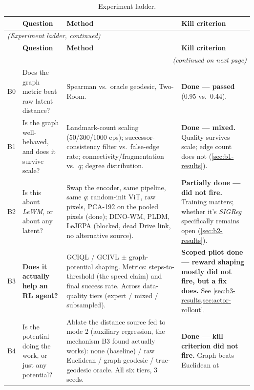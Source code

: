 \documentclass[11pt]{article}
\begin{document}
\begin{center}
\small
\begin{longtable}{@{}p{0.5cm}p{3.5cm}p{5.1cm}p{4.6cm}@{}}
\caption{Experiment ladder.} \\
\toprule
& \textbf{Question} & \textbf{Method} & \textbf{Kill criterion} \\
\midrule
\endfirsthead
\multicolumn{4}{l}{\small\itshape (Experiment ladder, continued)} \\
\toprule
& \textbf{Question} & \textbf{Method} & \textbf{Kill criterion} \\
\midrule
\endhead
\bottomrule
\multicolumn{4}{r}{\small\itshape (continued on next page)} \\
\endfoot
\bottomrule
\endlastfoot
B0 & Does the graph metric beat raw latent distance? & Spearman vs.\ oracle geodesic, Two-Room.
& \textcolor{cAmber}{\textbf{Done --- passed}} (0.95 vs.\ 0.44). \\
\addlinespace
B1 & Is the graph well-behaved, and does it survive scale? & Landmark-count scaling
(50/300/1000 eps); successor-consistency filter vs.\ false-edge rate; connectivity/fragmentation
vs.\ $q$; degree distribution. & \textcolor{cAmber}{\textbf{Done --- mixed.}} Quality survives
scale; edge count does not (\cref{sec:b1-results}). \\
\addlinespace
B2 & Is this about \emph{LeWM}, or about any latent? & Swap the encoder, same pipeline, same
$q$: random-init ViT, raw pixels, PCA-192 on the pooled pixels (done); DINO-WM, PLDM, LeJEPA
(blocked, dead Drive link, no alternative source). & \textcolor{cAmber}{\textbf{Partially done ---
did not fire.}} Training matters; whether it's \emph{SIGReg} specifically remains open
(\cref{sec:b2-results}). \\
\addlinespace
B3 & \textbf{Does it actually help an RL agent?} & GCIQL / GCIVL $\pm$ graph-potential shaping.
Metrics: steps-to-threshold (the speed claim) and final success rate. Across data-quality tiers
(expert / mixed / subsampled). & \textcolor{cAmber}{\textbf{Scoped pilot done --- reward shaping
mostly did not fire, but a fix does.}} See \cref{sec:b3-results,sec:actor-rollout}. \\
\addlinespace
B4 & Is the potential doing the work, or just any potential? & Ablate the distance source fed
to mode 2 (auxiliary regression, the mechanism B3 found actually works): none (baseline) /
raw Euclidean / graph geodesic / true-geodesic oracle. All six tiers, 3 seeds. &
\textcolor{cAmber}{\textbf{Done --- kill criterion did not fire.}} Graph beats Euclidean at

\end{longtable}
\end{center}
\end{document}
